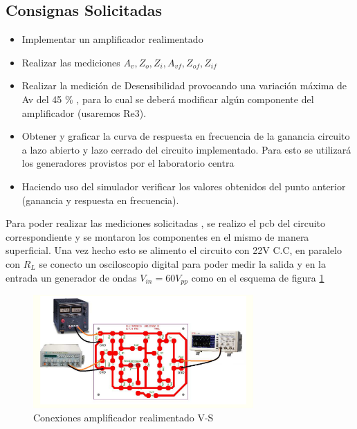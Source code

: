\documentclass[12pt, letterpaper]{article}
\begin{document}
\subsection{Consignas Solicitadas}
\begin{itemize}
	\item  Implementar un amplificador realimentado
    \item  Realizar las mediciones $A_v, Z_o,Z_i, A_{vf},Z_{of},Z_{if} $
    \item  Realizar la medición de Desensibilidad provocando una variación máxima de Av del 45 \% , para lo cual se deberá modificar algún componente del amplificador (usaremos Re3).
    \item Obtener y graficar la curva de respuesta en frecuencia de la ganancia circuito a lazo abierto y lazo cerrado del circuito implementado. Para esto se utilizará los generadores provistos por el laboratorio centra
    \item Haciendo uso del simulador verificar los valores obtenidos del punto anterior (ganancia y respuesta en frecuencia).
\end{itemize}
Para poder realizar las mediciones solicitadas , se realizo el pcb del circuito correspondiente y se montaron los componentes en el mismo de manera superficial.
Una vez hecho esto se alimento el circuito con 22V C.C, en paralelo con $R_L$ se conecto un osciloscopio digital para poder medir la salida y en la entrada un generador de ondas $V_{in}= 60 V_{pp}$ como en el esquema de figura \ref{fig:coneccion_lab}
\begin{figure}[H]
	\centering
	\includegraphics[width=0.75\textwidth]{Imagenes/conexion.png}
	\caption{Conexiones amplificador realimentado V-S}
	\label{fig:coneccion_lab}
\end{figure}
\end{document}
